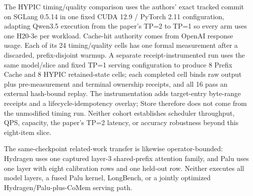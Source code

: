\documentclass{article}
\begin{document}
The HYPIC timing/quality comparison uses the authors' exact tracked commit on
SGLang 0.5.14 in one fixed CUDA 12.9 / PyTorch 2.11 configuration, adapting
Qwen3.5 execution from the paper's TP=2 to TP=1 so every arm uses one H20-3e per
workload.  Cache-hit authority comes from OpenAI response usage.  Each of its 24
timing/quality cells has one formal measurement after a discarded,
prefix-disjoint warmup.  A separate receipt-instrumented run uses the same
model/slice and fixed TP=1 serving configuration to produce 8 Prefix Cache and
8 HYPIC retained-state cells; each completed cell binds raw output plus
pre-measurement and terminal ownership receipts, and all 16 pass an external
hash-bound replay.  The instrumentation adds target-entry byte-range receipts
and a lifecycle-idempotency overlay; Store therefore does not come from the
unmodified timing run.  Neither cohort establishes scheduler throughput, QPS,
capacity, the paper's TP=2 latency, or accuracy robustness beyond this
eight-item slice.

The same-checkpoint related-work transfer is likewise operator-bounded:
Hydragen uses one captured layer-3 shared-prefix attention family, and Palu
uses one layer with eight calibration rows and one held-out row.  Neither
executes all model layers, a fused Palu kernel, LongBench, or a jointly
optimized Hydragen/Palu-plus-CoMem serving path.
\end{document}
